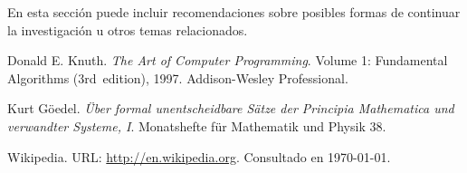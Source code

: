 \documentclass[a4paper,10pt,twocolumn]{article}
\begin{document}
  En esta sección puede incluir recomendaciones sobre posibles formas de continuar
  la investigación u otros temas relacionados.




\begin{thebibliography}{99}
	 Donald E. Knuth. \emph{The Art of Computer Programming}.
		Volume 1: Fundamental Algorithms (3rd~edition), 1997.
		Addison-Wesley Professional.

	 Kurt Göedel. \emph{Über formal unentscheidbare Sätze der
		Principia Mathematica und verwandter Systeme, I}.
		Monatshefte für Mathematik und Physik 38.

	 Wikipedia. URL: \href{http://en.wikipedia.org}
	  {http://en.wikipedia.org}.
		Consultado en \today.

\end{thebibliography}


\label{end}
\end{document}
